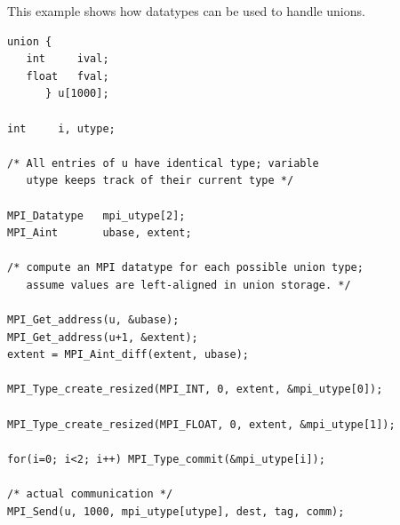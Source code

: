 \begin{example}
\label{pt2pt-exII}
%
%
This example shows how datatypes can be used to handle unions.

\begin{lstlisting}[language={[MPI]C}]
union {
   int     ival;
   float   fval;
      } u[1000];

int     i, utype;

/* All entries of u have identical type; variable
   utype keeps track of their current type */

MPI_Datatype   mpi_utype[2];
MPI_Aint       ubase, extent;

/* compute an MPI datatype for each possible union type;
   assume values are left-aligned in union storage. */

MPI_Get_address(u, &ubase);
MPI_Get_address(u+1, &extent);
extent = MPI_Aint_diff(extent, ubase);

MPI_Type_create_resized(MPI_INT, 0, extent, &mpi_utype[0]);

MPI_Type_create_resized(MPI_FLOAT, 0, extent, &mpi_utype[1]);

for(i=0; i<2; i++) MPI_Type_commit(&mpi_utype[i]);

/* actual communication */
MPI_Send(u, 1000, mpi_utype[utype], dest, tag, comm);
\end{lstlisting}
\end{example}

